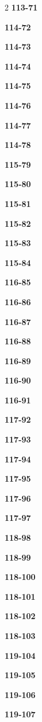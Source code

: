 \documentclass[10pt,a4paper]{article}
\begin{document}
\begin{multicols}{2}
\noindent\textbf{113-71}\ \par
\noindent\textbf{114-72}\ \par
\noindent\textbf{114-73}\ \par
\noindent\textbf{114-74}\ \par
\noindent\textbf{114-75}\ \par
\noindent\textbf{114-76}\ \par
\noindent\textbf{114-77}\ \par
\noindent\textbf{114-78}\ \par
\noindent\textbf{115-79}\ \par
\noindent\textbf{115-80}\ \par
\noindent\textbf{115-81}\ \par
\noindent\textbf{115-82}\ \par
\noindent\textbf{115-83}\ \par
\noindent\textbf{115-84}\ \par
\noindent\textbf{116-85}\ \par
\noindent\textbf{116-86}\ \par
\noindent\textbf{116-87}\ \par
\noindent\textbf{116-88}\ \par
\noindent\textbf{116-89}\ \par
\noindent\textbf{116-90}\ \par
\noindent\textbf{116-91}\ \par
\noindent\textbf{117-92}\ \par
\noindent\textbf{117-93}\ \par
\noindent\textbf{117-94}\ \par
\noindent\textbf{117-95}\ \par
\noindent\textbf{117-96}\ \par
\noindent\textbf{117-97}\ \par
\noindent\textbf{118-98}\ \par
\noindent\textbf{118-99}\ \par
\noindent\textbf{118-100}\ \par
\noindent\textbf{118-101}\ \par
\noindent\textbf{118-102}\ \par
\noindent\textbf{118-103}\ \par
\noindent\textbf{119-104}\ \par
\noindent\textbf{119-105}\ \par
\noindent\textbf{119-106}\ \par
\noindent\textbf{119-107}\ \par

\end{multicols}
\end{document}
